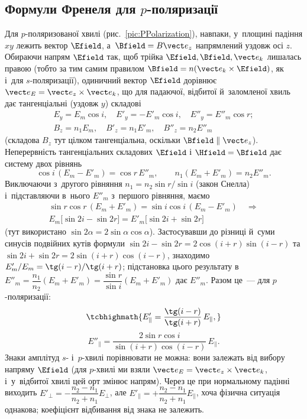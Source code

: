 \subsection*{Формули Френеля для $p$-поляризації}

Для $p$-поляризованої хвилі (рис.~\ref{pic:PPolarization}), навпаки, у~площині падіння $xy$ лежить вектор $\Efield$, а~$\Bfield=B\vect e_z$
напрямлений уздовж осі $z$. Обираючи напрям $\Efield$ так, щоб трійка $\Efield,\Bfield,\vect e_k$ лишалась правою (тобто за тим самим
правилом $\Bfield=n(\vect e_k\times\Efield)$, як і~для $s$-поляризації), одиничний вектор $\Efield$ дорівнює $\vect e_E=\vect e_z\times\vect e_k$, що для падаючої, відбитої й~заломленої хвиль дає тангенціальні (уздовж $y$) складові
\begin{multline*}
	E_y = E_m\cos i,\quad E'_y=-E'_m\cos i,\quad E''_y=E''_m\cos r; \\ B_z=n_1E_m,\quad B'_z=n_1E'_m,\quad B''_z=n_2E''_m
\end{multline*}
(складова $B_z$ тут цілком тангенціальна, оскільки $\Bfield\parallel\vect e_z$). Неперервність тангенціальних складових $\Efield$ і
$\Hfield=\Bfield$ дає систему двох рівнянь
\begin{equation}\label{eq:FresnelPBoundary}
	\cos i\,(E_m-E'_m) = \cos r\,E''_m, \qquad n_1(E_m+E'_m)=n_2E''_m.
\end{equation}
Виключаючи з~другого рівняння $n_1=n_2\sin r/\sin i$ (закон Снелла) і~підставляючи в~нього $E''_m$ з~першого рівняння, маємо
\begin{multline*}
	\sin r\cos r\,(E_m+E'_m) = \sin i\cos i\,(E_m-E'_m) \quad\Longrightarrow\\E_m\big[\sin2i-\sin2r\big] = E'_m\big[\sin2i+\sin2r\big]
\end{multline*}
(тут використано $\sin2\alpha=2\sin\alpha\cos\alpha$). Застосувавши до різниці й~суми синусів подвійних кутів формули $\sin2i-\sin2r=2\cos(i+r)\sin(i-r)$
та $\sin2i+\sin2r=2\sin(i+r)\cos(i-r)$, знаходимо $E'_m/E_m=\tg(i-r)/\tg(i+r)$; підстановка цього результату в~$E''_m=\dfrac{n_1}{n_2}(E_m+E'_m)=\dfrac{\sin
		r}{\sin i}(E_m+E'_m)$ дає $E''_m$. Разом це~---  для $p$-поляризації:
\begin{equation}\label{eq:FresnelPReflection}
	\tcbhighmath{
		E'_\parallel = \frac{\tg(i-r)}{\tg(i+r)}\, E_\parallel,
	}
\end{equation}
\begin{equation}\label{eq:FresnelPTransmission}
	E''_\parallel = \frac{2\sin r\cos i}{\sin(i+r)\cos(i-r)}\, E_\parallel.
\end{equation}
Знаки амплітуд $s$- і~$p$-хвилі порівнювати не можна: вони залежать від вибору напряму $\Efield$ (для $p$-хвилі ми взяли $\vect e_E=\vect e_z\times\vect e_k$,
і~у~відбитої хвилі цей орт змінює напрям). Через це при нормальному падінні виходить $E'_\perp=-\dfrac{n_2-n_1}{n_2+n_1}E_\perp$, але $E'_\parallel=+\dfrac{n_2-n_1}{n_2+n_1}E_\parallel$,
хоча фізична ситуація однакова; коефіцієнт відбивання від знака не залежить.

